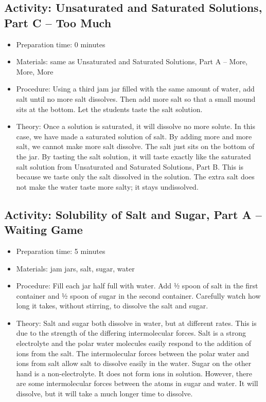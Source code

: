 \begin{itemize}
{\begin{itemize}
\begin{itemize}
{\subsection{Activity: Unsaturated and Saturated Solutions, Part C – Too Much}
\begin{itemize}
\item{Preparation time: 0 minutes}
\item{Materials: same as Unsaturated and Saturated Solutions, Part A – More, More, More}
\item{Procedure: Using a third jam jar filled with the same amount of water, add salt until no more salt dissolves. Then add more salt so that a small mound sits at the bottom. Let the students taste the salt solution.}
\item{Theory:  Once a solution is saturated, it will dissolve no more solute. In this case, we have made a saturated solution of salt. By adding more and more salt, we cannot make more salt dissolve. The salt just sits on the bottom of the jar. By tasting the salt solution, it will taste exactly like the saturated salt solution from Unsaturated and Saturated Solutions, Part B. This is because we taste only the salt dissolved in the solution. The extra salt does not make the water taste more salty; it stays undissolved. }
\end{itemize}

\subsection{Activity: Solubility of Salt and Sugar, Part A – Waiting Game}
\begin{itemize}
\item{Preparation time: 5 minutes}
\item{Materials: jam jars, salt, sugar, water}
\item{Procedure: Fill each jar half full with water. Add ½ spoon of salt in the first container and ½ spoon of sugar in the second container. Carefully watch how long it takes, without stirring, to dissolve the salt and sugar.}
\item{Theory: Salt and sugar both dissolve in water, but at different rates. This is due to the strength of the differing intermolecular forces. Salt is a strong electrolyte and the polar water molecules easily respond to the addition of ions from the salt. The intermolecular forces between the polar water and ions from salt allow salt to dissolve easily in the water. Sugar on the other hand is a non-electrolyte. It does not form ions in solution. However, there are some intermolecular forces between the atoms in sugar and water. It will dissolve, but it will take a much longer time to dissolve.}
\end{itemize}

}
\end{itemize}
\end{itemize}}
\end{itemize}
